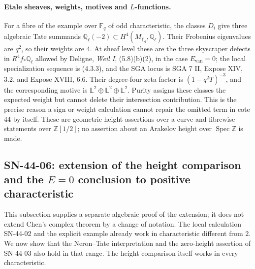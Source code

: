 \documentclass[11pt,a4paper]{article}
\theoremstyle{definition}
\theoremstyle{remark}
\begin{document}
\paragraph{Etale sheaves, weights, motives and $L$-functions.}
For a fibre of the example over $\mathbb F_q$ of odd characteristic,
the classes $D_i$ give three algebraic Tate summands
$\mathbb Q_\ell(-2)\subset H^4(M_{\overline{\mathbb F}_q},\mathbb Q_\ell)$.
Their Frobenius eigenvalues are $q^2$, so their weights are $4$.
At sheaf level these are the three skyscraper defects in
$R^4f_*\mathbb Q_\ell$ allowed by Deligne, \emph{Weil I},
(5.8)(b)(2), in the case $E_{\mathrm{van}}=0$; the local
specialization sequence is (4.3.3), and the SGA locus is SGA 7 II,
Expose XIV, 3.2, and Expose XVIII, 6.6.  Their degree-four zeta
factor is $(1-q^2T)^{-3}$, and the corresponding motive is
$\mathbb L^2\oplus\mathbb L^2\oplus\mathbb L^2$.
Purity assigns these classes the expected weight but cannot delete
their intersection contribution.  This is the precise reason a
sign or weight calculation cannot repair the omitted term in
cote 44 by itself.  These are geometric height assertions over a
curve and fibrewise statements over $\mathbb Z[1/2]$; no assertion
about an Arakelov height over $\operatorname{Spec}\mathbb Z$ is made.

\subsection{SN-44-06: extension of the height comparison and the
\texorpdfstring{$E=0$}{E=0} conclusion to positive characteristic}
\label{sn:44-06}

This subsection supplies a separate algebraic proof of the extension;
it does not extend Chen's complex theorem by a change of notation.
The local calculation SN-44-02 and the explicit example already work
in characteristic different from $2$.  We now show that the
Neron--Tate interpretation and the zero-height assertion of SN-44-03
also hold in that range.  The height comparison itself works in every
characteristic.
\end{document}
